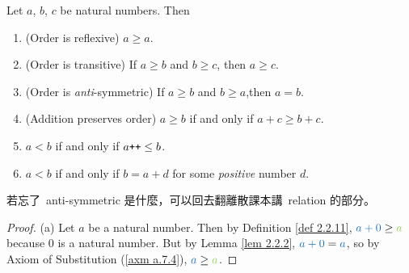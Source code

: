 \begin{proposition}  \label{prop 2.2.12}
Let \(a\), \(b\), \(c\) be natural numbers. Then
    \begin{enumerate}
        \item (Order is reflexive) \(a \geq a\).
        \item (Order is transitive) If \(a \geq b\) and \(b \geq c\), then \(a \geq c\).
        \item (Order is \emph{anti}-symmetric) If \(a \geq b\) and \(b \geq a\),then \(a = b\). 
        \item (Addition preserves order) \(a \geq b\) if and only if \(a + c \geq b + c\). 
        \item \(a < b\) if and only if \(a\texttt{++} \leq b\).
        \item \(a < b\) if and only if \(b = a + d\) for some \emph{positive} number \(d\).
    \end{enumerate}
\end{proposition}
\begin{note}
若忘了\ anti-symmetric 是什麼，可以回去翻離散課本講\ relation 的部分。
\end{note}
\begin{proof}{(a)}
Let \(a\) be a natural number. Then by Definition \ref{def 2.2.11}, \(\BLUE{a + 0} \geq \GREEN{a}\) because \(0\) is a natural number. But by Lemma \ref{lem 2.2.2}, \(\BLUE{a + 0} = \BLUE{a}\), so by Axiom of Substitution (\ref{axm a.7.4}), \(\BLUE{a} \geq \GREEN{a}\).
\end{proof}


